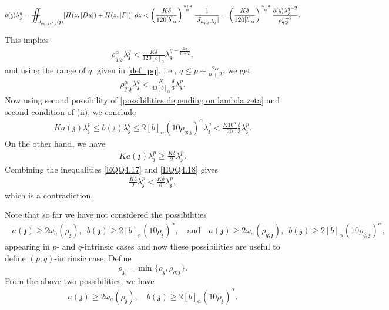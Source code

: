 \documentclass[11pt,oneside, english,reqno,twoside a4paper]{amsart}
\theoremstyle{definition}
\numberwithin{theorem}{section}
\numberwithin{equation}{section}
\newcommand{\iintss}{{\int\hspace{-0.28cm}\int}}
\newcommand{ \miints }{{\iintss\hspace{-0.56cm} -\hspace{-0.15cm}-}}
\newcommand{\miint}[1]{{\miints_{\hspace{-0.13cm}#1}}}
\begin{document}
\begin{align*}
b(\mathfrak{z})\lambda^q_{\mathfrak{z}}=\miint{J_{\rho_{q; \mathfrak{z}},\lambda_\mathfrak{z}}(\mathfrak{z})} [H(z,|Du|)+H(z,|F|)]\; dz < \left(\frac{K \delta}{120[b]_{\alpha}}\right)^{\frac{n+2}{\alpha}}\frac{1}{|J_{\rho_{q; \mathfrak{z}},\lambda_\mathfrak{z}}|}
=\left(\frac{K \delta}{120[b]_{\alpha}}\right)^{\frac{n+2}{\alpha}}\frac{b(\mathfrak{z})\lambda^{q-2}_{\mathfrak z}}{\rho^{n+2}_{q; \mathfrak z}}.
\end{align*}

This implies
\begin{align*}
    \rho^{\alpha}_{q; \mathfrak{z}}\lambda^q_{\mathfrak{z}} < \frac{K \delta}{120[b]_{\alpha}}\lambda^{q-\frac{2\alpha}{n+2}}_{\mathfrak{z}},
\end{align*}
and  using the range of $q$, given in \eqref{def_pq}, i.e., $q\leq p+\frac{2\alpha}{n+2}$, we get
\begin{align}\label{estimate on rho alpha}
    \rho^{\alpha}_{q; \mathfrak{z}}\lambda^q_{\mathfrak{z}}< \frac{K}{40[b]_{\alpha}}\frac{\delta}{3}\lambda^{p}_{\mathfrak{z}}.
\end{align}
Now using second possibility of \eqref{possibilities depending on lambda zeta} and second condition of (ii), we conclude
\begin{align}\label{EQQ4.17}
    Ka(\mathfrak{z})\lambda^p_{\mathfrak{z}}\leq b(\mathfrak{z})\lambda^q_{\mathfrak{z}}\leq 2[b]_{\alpha}(10\rho_{q; \mathfrak{z}})^{\alpha}\lambda^q_{\mathfrak{z}}< \frac{K10^\alpha}{20}\frac{\delta}{3}\lambda^p_{\mathfrak{z}}.
\end{align}
On the other hand, we have
\begin{align}\label{EQQ4.18}
    K a(\mathfrak{z})\lambda^p_{\mathfrak{z}}\geq \frac{K\delta}{2}\lambda^p_{\mathfrak{z}}.
\end{align}
Combining the inequalities \eqref{EQQ4.17} and \eqref{EQQ4.18} gives
\begin{align*}
    \frac{K \delta}{2}\lambda^p_{\mathfrak{z}}< \frac{K\delta}{6}\lambda^p_{\mathfrak{z}},
\end{align*}
which is a contradiction.

Note that so far we have not considered the possibilities
\begin{align*}
 \,\,\,a(\mathfrak{z})\geq 2\omega_a(\rho_{\mathfrak{z}}),\,\,\, b(\mathfrak{z})\geq 2[b]_{\alpha}\left(10 \rho_{\mathfrak{z}}\right)^{\alpha},\quad \text{and} \quad a(\mathfrak{z})\geq 2\omega_a(\rho_{q; \mathfrak{z}}),\,\,\, b(\mathfrak{z})\geq 2[b]_{\alpha}\left(10 \rho_{q; \mathfrak{z}}\right)^{\alpha},  
\end{align*}
appearing in $p$- and $q$-intrinsic cases and now these possibilities are useful to define $(p, q)$-intrinsic case. Define $$\widetilde \rho_{ \mathfrak z}=\min\{\rho_{\mathfrak z}, \rho_{q; \mathfrak z}\}.$$ From the above two possibilities, we have 
\begin{align*}
a(\mathfrak{z})\geq 2\omega_a(\widetilde \rho_{\mathfrak{z}}),\quad  b(\mathfrak{z})\geq 2[b]_{\alpha}\left(10 \widetilde \rho_{\mathfrak{z}}\right)^{\alpha}.   
\end{align*}
\end{document}
